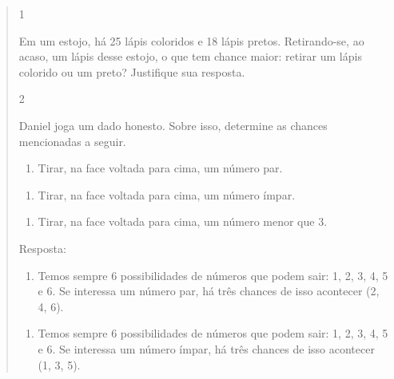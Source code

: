 \begin{mdframed}[linewidth=2pt,linecolor=salmao,roundcorner=2pt]
\begin{itemize}
{\begin{itemize}
\begin{escolha}
{\begin{quote}
{\begin{escolha}
{

\num{1}

Em um estojo, há 25 lápis coloridos e 18 lápis pretos. Retirando-se, ao
acaso, um lápis desse estojo, o que tem chance maior: retirar um lápis
colorido ou um preto? Justifique sua resposta.



\num{2}

Daniel joga um dado honesto. Sobre isso, determine as chances mencionadas a seguir.

\begin{enumerate}
\item
  Tirar, na face voltada para cima, um número par.
\end{enumerate}


\begin{enumerate}
\item
  Tirar, na face voltada para cima, um número ímpar.
\end{enumerate}


\begin{enumerate}
\item
  Tirar, na face voltada para cima, um número menor que 3.
\end{enumerate}


Resposta:

\begin{enumerate}
\item
  Temos sempre 6 possibilidades de números que podem sair: 1, 2, 3, 4, 5 e 6. Se interessa um número par, há três chances de isso acontecer (2, 4, 6).
\end{enumerate}

\begin{enumerate}
\item
  Temos sempre 6 possibilidades de números que podem sair: 1, 2, 3, 4, 5 e 6. Se interessa um número ímpar, há três chances de isso acontecer (1, 3, 5).
\end{enumerate}

}
\end{escolha}}
\end{quote}}
\end{escolha}
\end{itemize}}
\end{itemize}
\end{mdframed}
